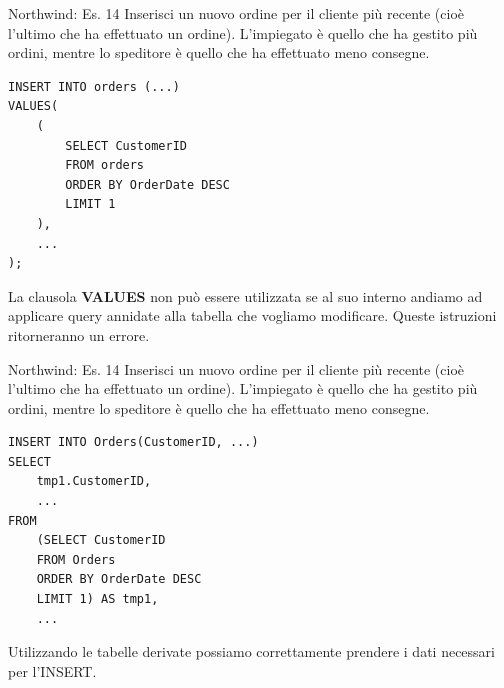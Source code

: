 %
\begin{frame}[fragile]{Northwind: Es. 14}
Inserisci un nuovo ordine per il cliente pi\`u recente (cio\`e l'ultimo che ha effettuato un ordine). 
L'impiegato \`e quello che ha gestito pi\`u ordini, mentre lo speditore \`e quello che ha effettuato 
meno consegne.
\pause
\begin{lstlisting}[basicstyle=\scriptsize\ttfamily]
INSERT INTO orders (...)
VALUES(
    (
        SELECT CustomerID
        FROM orders
        ORDER BY OrderDate DESC
        LIMIT 1
    ),
    ...
);
\end{lstlisting}
La clausola \textbf{VALUES} non pu\`o essere utilizzata se al suo interno andiamo ad applicare query annidate 
alla tabella che vogliamo modificare. Queste istruzioni ritorneranno un errore.
\end{frame}

\begin{frame}[fragile]{Northwind: Es. 14}
Inserisci un nuovo ordine per il cliente pi\`u recente (cio\`e l'ultimo che ha effettuato un ordine). 
L'impiegato \`e quello che ha gestito pi\`u ordini, mentre lo speditore \`e quello che ha effettuato 
meno consegne.
\begin{lstlisting}[basicstyle=\scriptsize\ttfamily]
INSERT INTO Orders(CustomerID, ...)
SELECT
	tmp1.CustomerID,
    ...
FROM
	(SELECT CustomerID
    FROM Orders
    ORDER BY OrderDate DESC
    LIMIT 1) AS tmp1,
    ...
\end{lstlisting}
Utilizzando le tabelle derivate possiamo correttamente prendere i dati necessari per l'INSERT.
\end{frame}

